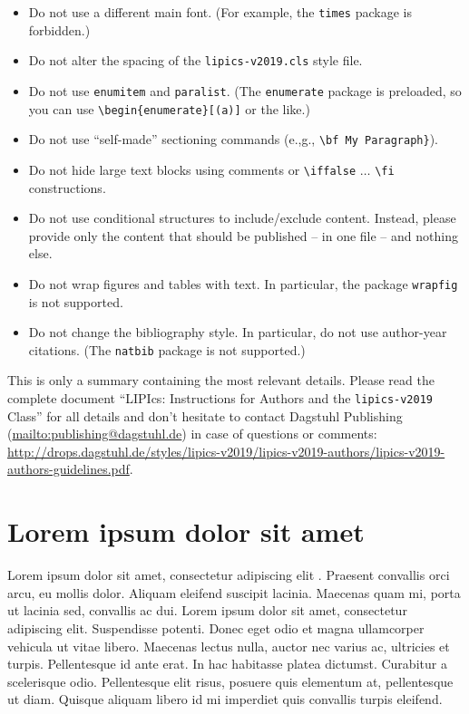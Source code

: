 \documentclass[a4paper ,UKenglish  ,cleveref ,autoref ,thm-restate   ]{lipics-v2019}
\def\tightlist{}
\begin{document}
\begin{itemize}
\tightlist
\item
  Do not use a different main font. (For example, the \texttt{times}
  package is forbidden.)
\item
  Do not alter the spacing of the \texttt{lipics-v2019.cls} style file.
\item
  Do not use \texttt{enumitem} and \texttt{paralist}. (The
  \texttt{enumerate} package is preloaded, so you can use
  \texttt{\textbackslash{}begin\{enumerate\}{[}(a){]}} or the like.)
\item
  Do not use ``self-made'' sectioning commands (e.,g.,
  \texttt{\textbackslash{}bf\ My\ Paragraph\}}).
\item
  Do not hide large text blocks using comments or
  \texttt{\textbackslash{}iffalse} \(\ldots\)
  \texttt{\textbackslash{}fi} constructions.
\item
  Do not use conditional structures to include/exclude content. Instead,
  please provide only the content that should be published -- in one
  file -- and nothing else.
\item
  Do not wrap figures and tables with text. In particular, the package
  \texttt{wrapfig} is not supported.
\item
  Do not change the bibliography style. In particular, do not use
  author-year citations. (The \texttt{natbib} package is not supported.)
\end{itemize}

\enlargethispage{\baselineskip}

This is only a summary containing the most relevant details. Please read
the complete document ``LIPIcs: Instructions for Authors and the
\texttt{lipics-v2019} Class'' for all details and don't hesitate to
contact Dagstuhl Publishing
(\href{publishing@dagstuhl.de}{mailto:publishing@dagstuhl.de}) in case
of questions or comments:
\href{\%60http://drops.dagstuhl.de/styles/lipics-v2019/lipics-v2019-authors/lipics-v2019-authors-guidelines.pdf}{http://drops.dagstuhl.de/styles/lipics-v2019/lipics-v2019-authors/lipics-v2019-authors-guidelines.pdf}.

\section{Lorem ipsum dolor sit amet}

Lorem ipsum dolor sit amet, consectetur adipiscing elit
\cite{DBLP:journals/cacm/Knuth74}. Praesent convallis orci arcu, eu
mollis dolor. Aliquam eleifend suscipit lacinia. Maecenas quam mi, porta
ut lacinia sed, convallis ac dui. Lorem ipsum dolor sit amet,
consectetur adipiscing elit. Suspendisse potenti. Donec eget odio et
magna ullamcorper vehicula ut vitae libero. Maecenas lectus nulla,
auctor nec varius ac, ultricies et turpis. Pellentesque id ante erat. In
hac habitasse platea dictumst. Curabitur a scelerisque odio.
Pellentesque elit risus, posuere quis elementum at, pellentesque ut
diam. Quisque aliquam libero id mi imperdiet quis convallis turpis
eleifend.
\end{document}
